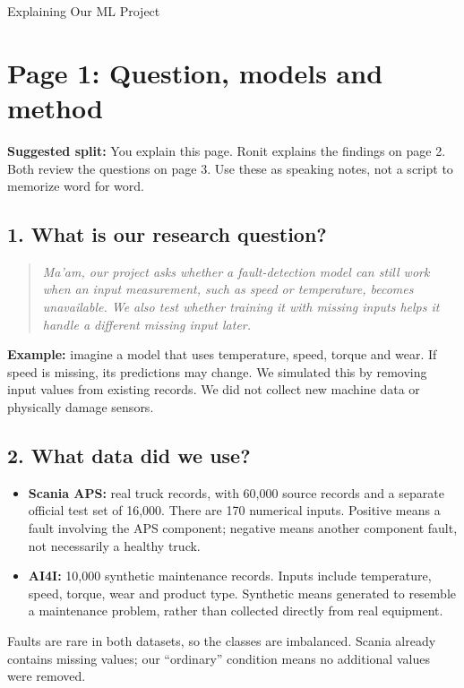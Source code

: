 \documentclass[11pt,a4paper]{article}
\begin{document}
\begin{center}{\Large Explaining Our ML Project}\end{center}
\section*{Page 1: Question, models and method}
\textbf{Suggested split:} You explain this page. Ronit explains the findings on page 2. Both review the questions on page 3. Use these as speaking notes, not a script to memorize word for word.

\subsection*{1. What is our research question?}
\begin{quote}\itshape
Ma'am, our project asks whether a fault-detection model can still work when an input measurement, such as speed or temperature, becomes unavailable. We also test whether training it with missing inputs helps it handle a different missing input later.
\end{quote}

\textbf{Example:} imagine a model that uses temperature, speed, torque and wear. If speed is missing, its predictions may change. We simulated this by removing input values from existing records. We did not collect new machine data or physically damage sensors.

\subsection*{2. What data did we use?}
\begin{itemize}
\item \textbf{Scania APS:} real truck records, with 60,000 source records and a separate official test set of 16,000. There are 170 numerical inputs. Positive means a fault involving the APS component; negative means another component fault, not necessarily a healthy truck.
\item \textbf{AI4I:} 10,000 synthetic maintenance records. Inputs include temperature, speed, torque, wear and product type. Synthetic means generated to resemble a maintenance problem, rather than collected directly from real equipment.
\end{itemize}
Faults are rare in both datasets, so the classes are imbalanced. Scania already contains missing values; our ``ordinary'' condition means no additional values were removed.
\end{document}
